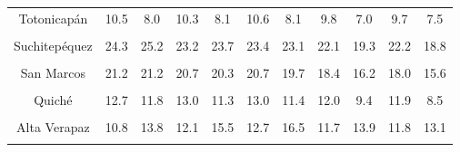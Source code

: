 {\begin{tabular}[t]{ccccccccccc}
Totonicapán & 10.5 & 8.0 & 10.3 & 8.1 & 10.6 & 8.1 & 9.8 & 7.0 & 9.7 & 7.5\\
\cellcolor[HTML]{B6B3FF}{Quetzaltenango} & \cellcolor[HTML]{B6B3FF}{34.5} & \cellcolor[HTML]{B6B3FF}{33.8} & \cellcolor[HTML]{B6B3FF}{32.9} & \cellcolor[HTML]{B6B3FF}{33.1} & \cellcolor[HTML]{B6B3FF}{32.4} & \cellcolor[HTML]{B6B3FF}{32.6} & \cellcolor[HTML]{B6B3FF}{28.7} & \cellcolor[HTML]{B6B3FF}{26.8} & \cellcolor[HTML]{B6B3FF}{27.8} & \cellcolor[HTML]{B6B3FF}{25.3}\\
Suchitepéquez & 24.3 & 25.2 & 23.2 & 23.7 & 23.4 & 23.1 & 22.1 & 19.3 & 22.2 & 18.8\\
\cellcolor[HTML]{B6B3FF}{Retalhuleu} & \cellcolor[HTML]{B6B3FF}{30.2} & \cellcolor[HTML]{B6B3FF}{30.4} & \cellcolor[HTML]{B6B3FF}{42.8} & \cellcolor[HTML]{B6B3FF}{30.6} & \cellcolor[HTML]{B6B3FF}{31.5} & \cellcolor[HTML]{B6B3FF}{30.6} & \cellcolor[HTML]{B6B3FF}{31.2} & \cellcolor[HTML]{B6B3FF}{27.4} & \cellcolor[HTML]{B6B3FF}{32.2} & \cellcolor[HTML]{B6B3FF}{27.1}\\
San Marcos & 21.2 & 21.2 & 20.7 & 20.3 & 20.7 & 19.7 & 18.4 & 16.2 & 18.0 & 15.6\\
\cellcolor[HTML]{B6B3FF}{Huehuetenango} & \cellcolor[HTML]{B6B3FF}{11.5} & \cellcolor[HTML]{B6B3FF}{10.9} & \cellcolor[HTML]{B6B3FF}{11.7} & \cellcolor[HTML]{B6B3FF}{10.9} & \cellcolor[HTML]{B6B3FF}{12.0} & \cellcolor[HTML]{B6B3FF}{11.0} & \cellcolor[HTML]{B6B3FF}{11.4} & \cellcolor[HTML]{B6B3FF}{9.0} & \cellcolor[HTML]{B6B3FF}{11.6} & \cellcolor[HTML]{B6B3FF}{8.3}\\
Quiché & 12.7 & 11.8 & 13.0 & 11.3 & 13.0 & 11.4 & 12.0 & 9.4 & 11.9 & 8.5\\
\cellcolor[HTML]{B6B3FF}{Baja Verapaz} & \cellcolor[HTML]{B6B3FF}{17.6} & \cellcolor[HTML]{B6B3FF}{16.9} & \cellcolor[HTML]{B6B3FF}{18.4} & \cellcolor[HTML]{B6B3FF}{17.3} & \cellcolor[HTML]{B6B3FF}{18.9} & \cellcolor[HTML]{B6B3FF}{17.3} & \cellcolor[HTML]{B6B3FF}{17.8} & \cellcolor[HTML]{B6B3FF}{13.7} & \cellcolor[HTML]{B6B3FF}{17.7} & \cellcolor[HTML]{B6B3FF}{13.8}\\
Alta Verapaz & 10.8 & 13.8 & 12.1 & 15.5 & 12.7 & 16.5 & 11.7 & 13.9 & 11.8 & 13.1\\
\cellcolor[HTML]{B6B3FF}{Petén} & \cellcolor[HTML]{B6B3FF}{22.3} & \cellcolor[HTML]{B6B3FF}{18.4} & \cellcolor[HTML]{B6B3FF}{22.9} & \cellcolor[HTML]{B6B3FF}{17.9} & \cellcolor[HTML]{B6B3FF}{22.1} & \cellcolor[HTML]{B6B3FF}{17.0} & \cellcolor[HTML]{B6B3FF}{20.1} & \cellcolor[HTML]{B6B3FF}{13.7} & \cellcolor[HTML]{B6B3FF}{19.8} & \cellcolor[HTML]{B6B3FF}{13.4}\\

\end{tabular}}
